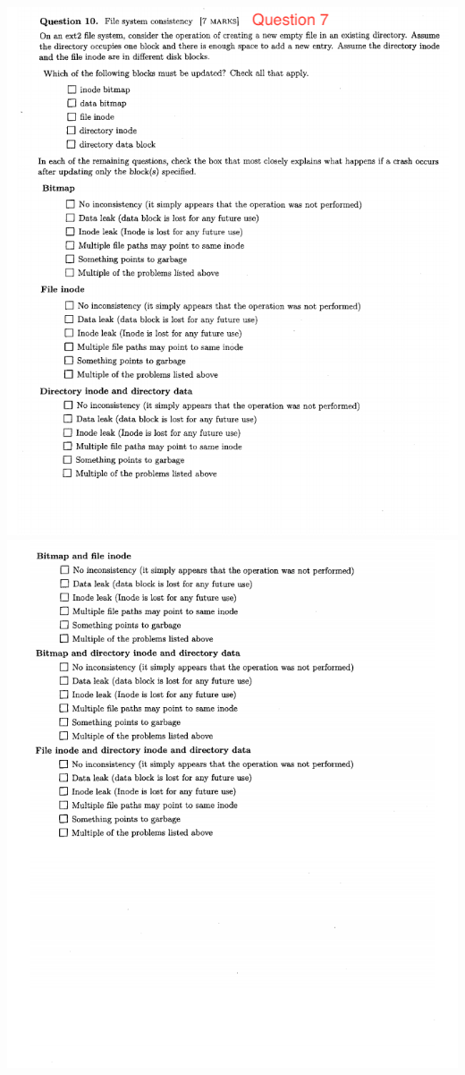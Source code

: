 \documentclass[12pt]{article}
\begin{document}
\begin{center}
\includegraphics[width=\linewidth]{../images/midterm_4_11.png}
\includegraphics[width=\linewidth]{../images/midterm_4_12.png}
\end{center}
\end{document}
